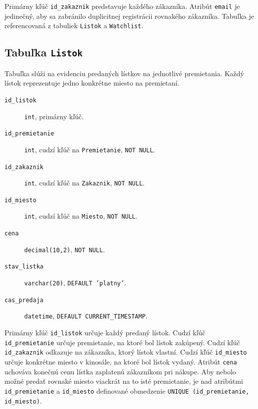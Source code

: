 \documentclass[11pt, a4paper]{article}
\begin{document}
Primárny kľúč \texttt{id\_zakaznik} predstavuje každého zákazníka.
Atribút \texttt{email} je jedinečný, aby sa zabránilo duplicitnej registrácii rovnakého zákazníka.
Tabuľka je referencovaná z tabuliek \texttt{Listok} a \texttt{Watchlist}.

\subsection{Tabuľka \texttt{Listok}}
Tabuľka slúži na evidenciu predaných lístkov na jednotlivé premietania. Každý lístok
reprezentuje jedno konkrétne miesto na premietaní.
\begin{description}
    \item[\texttt{id\_listok}] \texttt{int}, primárny kľúč.
    \item[\texttt{id\_premietanie}] \texttt{int}, cudzí kľúč na \texttt{Premietanie}, \texttt{NOT NULL}.
    \item[\texttt{id\_zakaznik}] \texttt{int}, cudzí kľúč na \texttt{Zakaznik}, \texttt{NOT NULL}.
    \item[\texttt{id\_miesto}] \texttt{int}, cudzí kľúč na \texttt{Miesto}, \texttt{NOT NULL}.
    \item[\texttt{cena}] \texttt{decimal(10,2)}, \texttt{NOT NULL}.
    \item[\texttt{stav\_listka}] \texttt{varchar(20)}, \texttt{DEFAULT 'platny'}.
    \item[\texttt{cas\_predaja}] \texttt{datetime}, \texttt{DEFAULT CURRENT\_TIMESTAMP}.
\end{description}
Primárny kľúč \texttt{id\_listok} určuje každý predaný lístok. Cudzí kľúč
\texttt{id\_premietanie} určuje premietanie, na ktoré bol lístok zakúpený. Cudzí kľúč
\texttt{id\_zakaznik} odkazuje na zákazníka, ktorý lístok vlastní.
Cudzí kľúč \texttt{id\_miesto} určuje konkrétne miesto v kinosále, na ktoré bol lístok vydaný.
Atribút \texttt{cena} uchováva konečnú cenu lístka zaplatenú zákazníkom pri nákupe.
Aby nebolo možné predať rovnaké miesto viackrát na to isté premietanie, je nad atribútmi
\texttt{id\_premietanie} a \texttt{id\_miesto} definované obmedzenie
\texttt{UNIQUE (id\_premietanie, id\_miesto)}.
\end{document}
